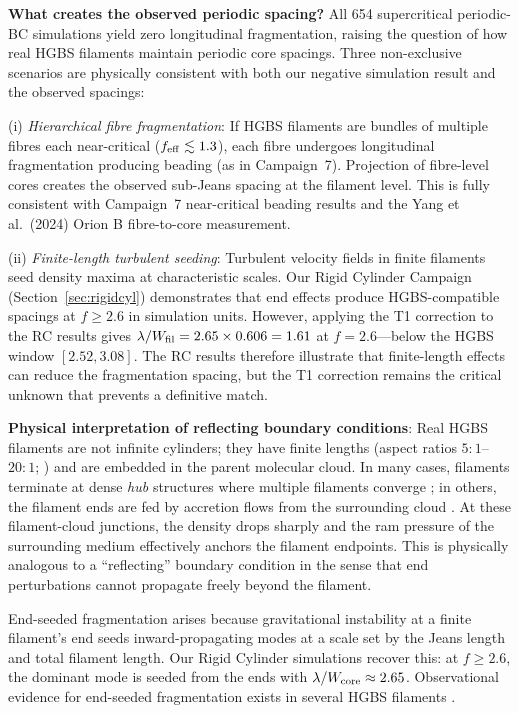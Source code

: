 \documentclass[twoside,twocolumn]{mnras}
\begin{document}
\textbf{What creates the observed periodic spacing?} All 654 supercritical periodic-BC
simulations yield zero longitudinal fragmentation, raising the question of how real HGBS
filaments maintain periodic core spacings. Three non-exclusive scenarios are physically
consistent with both our negative simulation result and the observed spacings:

(i) \textit{Hierarchical fibre fragmentation}: If HGBS filaments are bundles of multiple
fibres each near-critical ($f_{\rm eff} \lesssim 1.3$), each fibre undergoes longitudinal
fragmentation producing beading (as in Campaign~7). Projection of fibre-level cores creates
the observed sub-Jeans spacing at the filament level. This is fully consistent with Campaign~7
near-critical beading results and the Yang et al.\ (2024) Orion B fibre-to-core measurement.

(ii) \textit{Finite-length turbulent seeding}: Turbulent velocity fields in finite
filaments seed density maxima at characteristic scales. Our Rigid Cylinder Campaign
(Section~\ref{sec:rigidcyl}) demonstrates that end effects produce HGBS-compatible spacings
at $f \geq 2.6$ in simulation units. However, applying the T1 correction to the
RC results gives $\lambda/W_{\rm fil} = 2.65 \times 0.606 = 1.61$ at $f = 2.6$---below
the HGBS window $[2.52, 3.08]$. The RC results therefore illustrate that finite-length
effects can reduce the fragmentation spacing, but the T1 correction remains the critical
unknown that prevents a definitive match.

\textbf{Physical interpretation of reflecting boundary conditions}: Real HGBS filaments
are not infinite cylinders; they have finite lengths (aspect ratios $5:1$--$20:1$;
\citealt{Arzoumanian2019}) and are embedded in the parent molecular cloud. In many cases,
filaments terminate at dense \textit{hub} structures where multiple filaments converge
\citep{Andre2010}; in others, the filament ends are fed by accretion flows from the
surrounding cloud \citep{Inutsuka1997, Pineda2023}. At these filament-cloud junctions,
the density drops sharply and the ram pressure of the surrounding medium effectively
anchors the filament endpoints. This is physically analogous to a ``reflecting'' boundary
condition in the sense that end perturbations cannot propagate freely beyond the
filament.

End-seeded fragmentation arises because gravitational instability at a finite filament's end seeds inward-propagating modes at a scale set by the Jeans length and total filament length. Our Rigid Cylinder simulations recover this: at $f \geq 2.6$, the dominant mode is seeded from the ends with $\lambda/W_{\rm core} \approx 2.65$. Observational evidence for end-seeded fragmentation exists in several HGBS filaments \citep{Pineda2023, Andre2010}.
\end{document}
